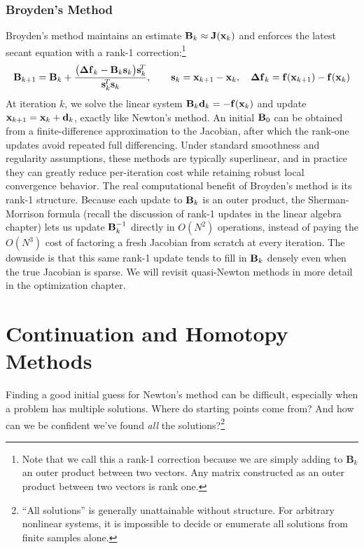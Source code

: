 \subsubsection{Broyden's Method}
Broyden's method maintains an estimate $\mathbf{B}_k \approx \mathbf{J}(\mathbf{x}_k)$ and enforces the latest secant equation with a rank-1 correction:\footnote{Note that we call this a rank-1 correction because we are simply adding to $\mathbf B_k$ an outer product between two vectors. Any matrix constructed as an outer product between two vectors is rank one. }
\begin{equation}
  \mathbf{B}_{k+1}
  =
  \mathbf{B}_k
  +
  \frac{\bigl(\mathbf{\Delta f}_k - \mathbf{B}_k \mathbf{s}_k\bigr)\mathbf{s}_k^{\!T}}
       {\mathbf{s}_k^{\!T}\mathbf{s}_k},
  \qquad
  \mathbf{s}_k = \mathbf{x}_{k+1}-\mathbf{x}_k,
  \quad
  \mathbf{\Delta f}_k = \mathbf{f}(\mathbf{x}_{k+1})-\mathbf{f}(\mathbf{x}_k)
\end{equation}
At iteration $k$, we solve the linear system $\mathbf{B}_k \mathbf{d}_k = -\mathbf{f}(\mathbf{x}_k)$ and update $\mathbf{x}_{k+1}=\mathbf{x}_k+\mathbf{d}_k$, exactly like Newton's method. An initial $\mathbf{B}_0$ can be obtained from a finite-difference approximation to the Jacobian, after which the rank-one updates avoid repeated full differencing. Under standard smoothness and regularity assumptions, these methods are typically superlinear, and in practice they can greatly reduce per-iteration cost while retaining robust local convergence behavior. The real computational benefit of Broyden's method is its rank-1 structure. Because each update to $\mathbf{B}_k$ is an outer product, the Sherman-Morrison formula (recall the discussion of rank-1 updates in the linear algebra chapter) lets us update $\mathbf{B}_k^{-1}$ directly in $O(N^2)$ operations, instead of paying the $O(N^3)$ cost of factoring a fresh Jacobian from scratch at every iteration. The downside is that this same rank-1 update tends to fill in $\mathbf{B}_k$ densely even when the true Jacobian is sparse. We will revisit quasi-Newton methods in more detail in the optimization chapter.



\section{Continuation and Homotopy Methods}

Finding a good initial guess for Newton's method can be difficult, especially when a problem has multiple solutions. Where do starting points come from? And how can we be confident we've found \emph{all} the solutions?\footnote{``All solutions'' is generally unattainable without structure. For arbitrary nonlinear systems, it is impossible to decide or enumerate all solutions from finite samples alone.}  

